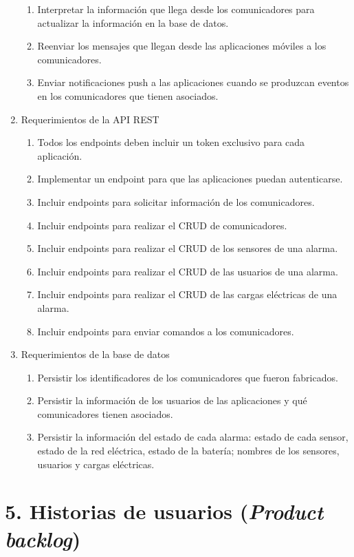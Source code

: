 \documentclass[
11pt, %
]{charter}
\begin{document}
\begin{enumerate}
\begin{enumerate}
			\item Interpretar la información que llega desde los comunicadores para actualizar la información en la base de datos.
			\item Reenviar los mensajes que llegan desde las aplicaciones móviles a los comunicadores.
			\item Enviar notificaciones push a las aplicaciones cuando se produzcan eventos en los comunicadores que tienen asociados.
		\end{enumerate}
	\item Requerimientos de la API REST
		\begin{enumerate}
			\item Todos los endpoints deben incluir un token exclusivo para cada aplicación.
			\item Implementar un endpoint para que las aplicaciones puedan autenticarse.
			\item Incluir endpoints para solicitar información de los comunicadores.
			\item Incluir endpoints para realizar el CRUD de comunicadores.
			\item Incluir endpoints para realizar el CRUD de los sensores de una alarma.
			\item Incluir endpoints para realizar el CRUD de las usuarios de una alarma.
			\item Incluir endpoints para realizar el CRUD de las cargas eléctricas de una alarma.
			\item Incluir endpoints para enviar comandos a los comunicadores.
		\end{enumerate}
	\item Requerimientos de la base de datos
		\begin{enumerate}
			\item Persistir los identificadores de los comunicadores que fueron fabricados.
			\item Persistir la información de los usuarios de las aplicaciones y qué comunicadores tienen asociados.
			\item Persistir la información del estado de cada alarma: estado de cada sensor, estado de la red eléctrica, estado de la batería; nombres de los sensores, usuarios y cargas eléctricas.
		\end{enumerate}

\end{enumerate}


\section{5. Historias de usuarios (\textit{Product backlog})}
\label{sec:backlog}
\end{document}
